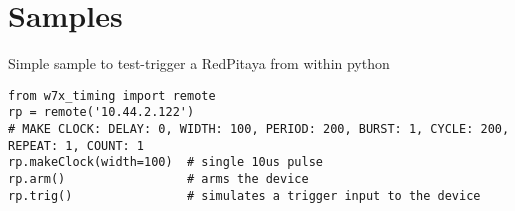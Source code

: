 \documentclass{article}
\newcounter{wavenum}
\newcommand*{\clki}{
  \draw (t_cur) -- ++(0,.3) -- ++(.5,0) -- ++(0,-.6) -- ++(.5,0) -- ++(0,.3)
    node[time] (t_cur) {};
}
\newcommand*{\bit}[2]{
  \draw (t_cur) -- ++(0,.6*#1-.3) -- ++(#2,0) -- ++(0,.3-.6*#1)
    node[time] (t_cur) {};
}
\newcommand*{\unknownbit}[1]{
  \draw[ultra thick,black!20] (t_cur) -- ++(#1,0) node[time] (t_cur) {...};
}
\newcommand{\nextwave}[1]{
  \path (0,\value{wavenum}) node[left] {#1} node[time] (t_cur) {};
  \addtocounter{wavenum}{-1}
}
\newenvironment{wave}{
  \begin{tikzpicture}[draw=black, yscale=.7,xscale=.58]
    \tikzstyle{time}=[coordinate]
}{\end{tikzpicture}}
\newenvironment{wave2}[2][10MHz clk]{
  \begin{wave}
    \setcounter{wavenum}{0} 
		\nextwave{#1}
    \foreach \t in {-1,0,...,23}{
      \draw[dotted] (t_cur) +(0,.5) node[above] {\t} -- ++(0,.4-#2);
      \clki
    }
		\unknownbit{1}{1}
		\foreach \t in {88,89,...,101}{
      \draw[dotted] (t_cur) +(0,.5) node[above] {\t} -- ++(0,.4-3);
      \clki
    }
}{\end{wave}}
\begin{document}

\section*{Samples}
Simple sample to test-trigger a RedPitaya from within python
\begin{lstlisting}
from w7x_timing import remote
rp = remote('10.44.2.122')
# MAKE CLOCK: DELAY: 0, WIDTH: 100, PERIOD: 200, BURST: 1, CYCLE: 200, REPEAT: 1, COUNT: 1
rp.makeClock(width=100)  # single 10us pulse
rp.arm()                 # arms the device
rp.trig()                # simulates a trigger input to the device
\end{lstlisting}
\end{document}
